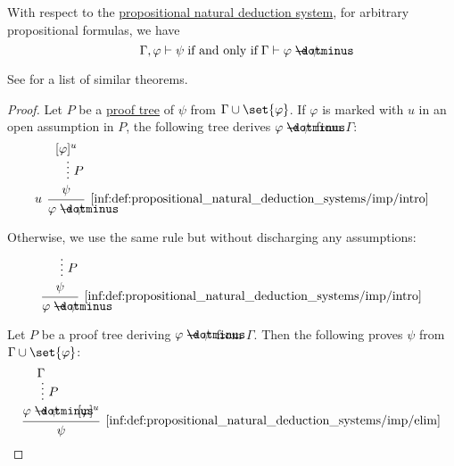 \begin{theorem}\label{thm:propositional_syntactic_deduction_theorem}
  With respect to the \hyperref[def:abstract_natural_deduction_system]{propositional natural deduction system}, for arbitrary propositional formulas, we have
  \begin{equation*}
    \Gamma, \varphi \vdash \psi \T{if and only if} \Gamma \vdash \varphi \synimplies \psi.
  \end{equation*}
\end{theorem}
\begin{comments}
  \item See  for a list of similar theorems.
\end{comments}
\begin{proof}
  \SufficiencySubProof Let \( P \) be a \hyperref[def:natural_deduction_proof_tree]{proof tree} of \( \psi \) from \( \Gamma \cup \set{ \varphi } \). If \( \varphi \) is marked with \( u \) in an open assumption in \( P \), the following tree derives \( \varphi \synimplies \psi \) from \( \Gamma \):
  \begin{equation*}
    \begin{prooftree}
      \hypo{ [\varphi]^u }
      \ellipsis { \( P \) } { \psi }
      \infer[left label=\( u \)]1[\ref{inf:def:propositional_natural_deduction_systems/imp/intro}]{ \varphi \synimplies \psi }
    \end{prooftree}
  \end{equation*}

  Otherwise, we use the same rule but without discharging any assumptions:
  \begin{equation*}
    \begin{prooftree}
      \hypo{}
      \ellipsis { \( P \) } { \psi }
      \infer1[\ref{inf:def:propositional_natural_deduction_systems/imp/intro}]{ \varphi \synimplies \psi }
    \end{prooftree}
  \end{equation*}

  \NecessitySubProof Let \( P \) be a proof tree deriving \( \varphi \synimplies \psi \) from \( \Gamma \). Then the following proves \( \psi \) from \( \Gamma \cup \set{ \varphi } \):
  \begin{equation*}
    \begin{prooftree}
      \hypo {\Gamma}
      \ellipsis { \( P \) } { \varphi \synimplies \psi }

      \hypo { [\varphi]^u }
      \infer2[\ref{inf:def:propositional_natural_deduction_systems/imp/elim}]{ \psi }
    \end{prooftree}
  \end{equation*}
\end{proof}

